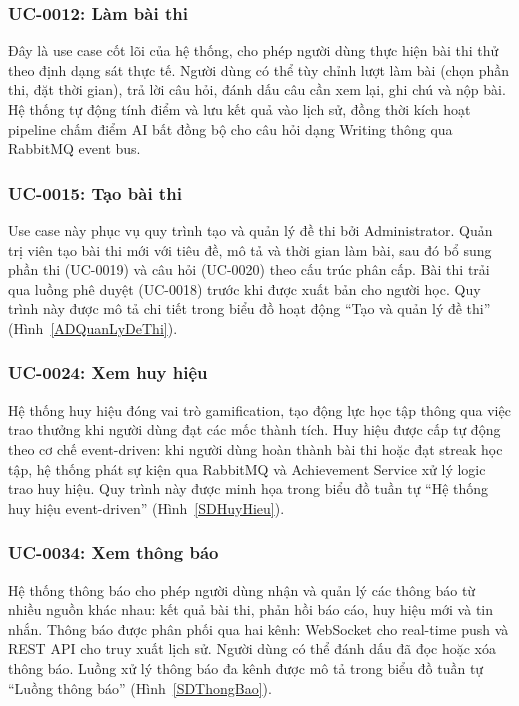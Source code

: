 \subsubsection{UC-0012: Làm bài thi}
Đây là use case cốt lõi của hệ thống, cho phép người dùng thực hiện bài thi thử theo định dạng sát thực tế. Người dùng có thể tùy chỉnh lượt làm bài (chọn phần thi, đặt thời gian), trả lời câu hỏi, đánh dấu câu cần xem lại, ghi chú và nộp bài. Hệ thống tự động tính điểm và lưu kết quả vào lịch sử, đồng thời kích hoạt pipeline chấm điểm AI bất đồng bộ cho câu hỏi dạng Writing thông qua RabbitMQ event bus.



\subsubsection{UC-0015: Tạo bài thi}
Use case này phục vụ quy trình tạo và quản lý đề thi bởi Administrator. Quản trị viên tạo bài thi mới với tiêu đề, mô tả và thời gian làm bài, sau đó bổ sung phần thi (UC-0019) và câu hỏi (UC-0020) theo cấu trúc phân cấp. Bài thi trải qua luồng phê duyệt (UC-0018) trước khi được xuất bản cho người học. Quy trình này được mô tả chi tiết trong biểu đồ hoạt động ``Tạo và quản lý đề thi'' (Hình~\ref{ADQuanLyDeThi}).



\subsubsection{UC-0024: Xem huy hiệu}
Hệ thống huy hiệu đóng vai trò gamification, tạo động lực học tập thông qua việc trao thưởng khi người dùng đạt các mốc thành tích. Huy hiệu được cấp tự động theo cơ chế event-driven: khi người dùng hoàn thành bài thi hoặc đạt streak học tập, hệ thống phát sự kiện qua RabbitMQ và Achievement Service xử lý logic trao huy hiệu. Quy trình này được minh họa trong biểu đồ tuần tự ``Hệ thống huy hiệu event-driven'' (Hình~\ref{SDHuyHieu}).



\subsubsection{UC-0034: Xem thông báo}
Hệ thống thông báo cho phép người dùng nhận và quản lý các thông báo từ nhiều nguồn khác nhau: kết quả bài thi, phản hồi báo cáo, huy hiệu mới và tin nhắn. Thông báo được phân phối qua hai kênh: WebSocket cho real-time push và REST API cho truy xuất lịch sử. Người dùng có thể đánh dấu đã đọc hoặc xóa thông báo. Luồng xử lý thông báo đa kênh được mô tả trong biểu đồ tuần tự ``Luồng thông báo'' (Hình~\ref{SDThongBao}).

